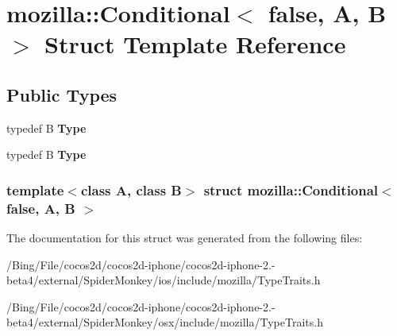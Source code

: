 \hypertarget{structmozilla_1_1_conditional_3_01false_00_01_a_00_01_b_01_4}{\section{mozilla\-:\-:Conditional$<$ false, A, B $>$ Struct Template Reference}
\label{structmozilla_1_1_conditional_3_01false_00_01_a_00_01_b_01_4}
}
\subsection*{Public Types}
\begin{DoxyCompactItemize}
\item 
\hypertarget{structmozilla_1_1_conditional_3_01false_00_01_a_00_01_b_01_4_a564dedde25345fc2484bd59719ac76f7}{typedef B {\bfseries Type}}\label{structmozilla_1_1_conditional_3_01false_00_01_a_00_01_b_01_4_a564dedde25345fc2484bd59719ac76f7}

\item 
\hypertarget{structmozilla_1_1_conditional_3_01false_00_01_a_00_01_b_01_4_a564dedde25345fc2484bd59719ac76f7}{typedef B {\bfseries Type}}\label{structmozilla_1_1_conditional_3_01false_00_01_a_00_01_b_01_4_a564dedde25345fc2484bd59719ac76f7}

\end{DoxyCompactItemize}
\subsubsection*{template$<$class A, class B$>$ struct mozilla\-::\-Conditional$<$ false, A, B $>$}



The documentation for this struct was generated from the following files\-:\begin{DoxyCompactItemize}
\item 
/\-Bing/\-File/cocos2d/cocos2d-\/iphone/cocos2d-\/iphone-\/2.-\/beta4/external/\-Spider\-Monkey/ios/include/mozilla/Type\-Traits.\-h\item 
/\-Bing/\-File/cocos2d/cocos2d-\/iphone/cocos2d-\/iphone-\/2.-\/beta4/external/\-Spider\-Monkey/osx/include/mozilla/Type\-Traits.\-h\end{DoxyCompactItemize}
